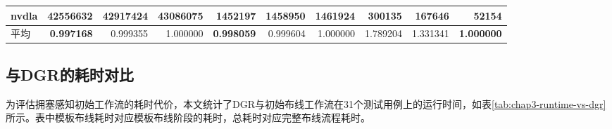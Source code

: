 \begin{table}[!htbp]
{\begin{tabular}{l rrr rrr rrr}
            nvdla                  & \textbf{42556632} & 42917424          & 43086075         & \textbf{1452197} & 1458950           & 1461924          & 300135         & 167646          & \textbf{52154} \\
            \midrule
            平均 & \textbf{0.997168} & 0.999355          & 1.000000         & \textbf{0.998059} & 0.999604           & 1.000000          & 1.789204       & 1.331341        & \textbf{1.000000} \\
            \bottomrule
        \end{tabular}
    }
\end{table}

\subsection{与DGR的耗时对比}

为评估拥塞感知初始工作流的耗时代价，本文统计了DGR与初始布线工作流在31个测试用例上的运行时间，如表\ref{tab:chap3-runtime-vs-dgr}所示。表中模板布线耗时对应模板布线阶段的耗时，总耗时对应完整布线流程耗时。

